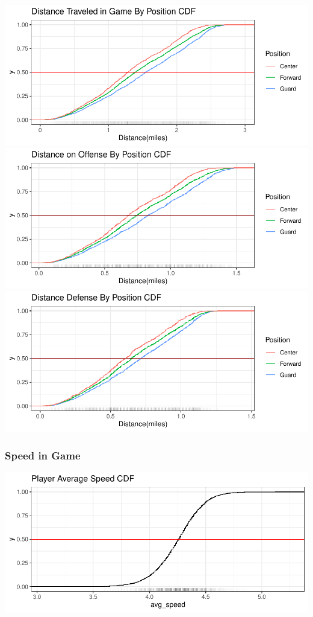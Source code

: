 \documentclass[
]{article}
\begin{document}
\includegraphics{EDA_files/figure-latex/unnamed-chunk-4-1.pdf}
\includegraphics{EDA_files/figure-latex/unnamed-chunk-4-2.pdf}
\includegraphics{EDA_files/figure-latex/unnamed-chunk-4-3.pdf}

\hypertarget{speed-in-game}{%
\subsubsection{Speed in Game}\label{speed-in-game}}

\includegraphics{EDA_files/figure-latex/unnamed-chunk-5-1.pdf}
\end{document}

